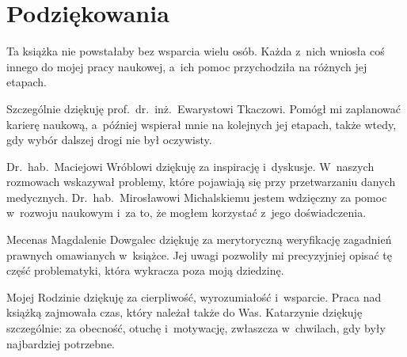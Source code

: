 \chapter*{Podziękowania}

Ta książka nie powstałaby bez wsparcia wielu osób. Każda z~nich wniosła coś innego do mojej pracy naukowej, a~ich pomoc przychodziła na różnych jej etapach.

Szczególnie dziękuję prof.~dr.~inż.~Ewarystowi Tkaczowi. Pomógł mi zaplanować karierę naukową, a~później wspierał mnie na kolejnych jej etapach, także wtedy, gdy wybór dalszej drogi nie był oczywisty.

Dr.~hab.~Maciejowi Wróblowi dziękuję za inspirację i~dyskusje. W~naszych rozmowach wskazywał problemy, które pojawiają się przy przetwarzaniu danych medycznych. Dr.~hab.~Mirosławowi Michalskiemu jestem wdzięczny za pomoc w~rozwoju naukowym i~za to, że mogłem korzystać z~jego doświadczenia.

Mecenas Magdalenie Dowgalec dziękuję za merytoryczną weryfikację zagadnień prawnych omawianych w~książce. Jej uwagi pozwoliły mi precyzyjniej opisać tę część problematyki, która wykracza poza moją dziedzinę.

Mojej Rodzinie dziękuję za cierpliwość, wyrozumiałość i~wsparcie. Praca nad książką zajmowała czas, który należał także do Was. Katarzynie dziękuję szczególnie: za obecność, otuchę i~motywację, zwłaszcza w~chwilach, gdy były najbardziej potrzebne.